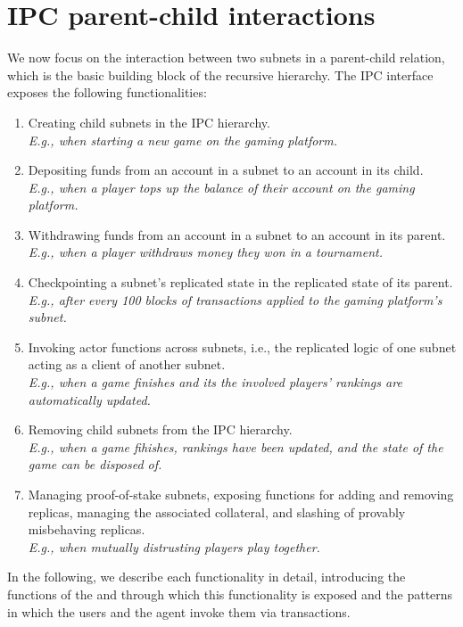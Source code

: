 \section{IPC parent-child interactions}
\label{sec:functionality}

We now focus on the interaction between two subnets in a parent-child relation, which is the basic building block of the recursive \ipc hierarchy.
The IPC interface exposes the following functionalities:
\begin{enumerate}

    \item Creating child subnets in the IPC hierarchy.\\
    \emph{E.g., when starting a new game on the gaming platform.}
    
    \item Depositing funds from an account in a subnet to an account in its child.\\
    \emph{E.g., when a player tops up the balance of their account on the gaming platform.}
    
    \item Withdrawing funds from an account in a subnet to an account in its parent.\\
    \emph{E.g., when a player withdraws money they won in a tournament.}
    
    \item Checkpointing a subnet's replicated state in the replicated state of its parent.\\
    \emph{E.g., after every 100 blocks of transactions applied to the gaming platform's subnet.}
    
    \item Invoking actor functions across subnets, i.e., the replicated logic of one subnet acting as a client of another subnet.\\
    \emph{E.g., when a game finishes and its the involved players' rankings are automatically updated.}
    
    \item Removing child subnets from the IPC hierarchy.\\
    \emph{E.g., when a game fihishes, rankings have been updated, and the state of the game can be disposed of.}
    
    \item Managing proof-of-stake subnets, exposing functions for adding and removing replicas, managing the associated collateral, and slashing of provably misbehaving replicas.\\
    \emph{E.g., when mutually distrusting players play together.}
\end{enumerate}
In the following, we describe each functionality in detail, introducing the functions of the \gw and \sa through which this functionality is exposed
and the patterns in which the users and the \ipc agent invoke them via transactions.

